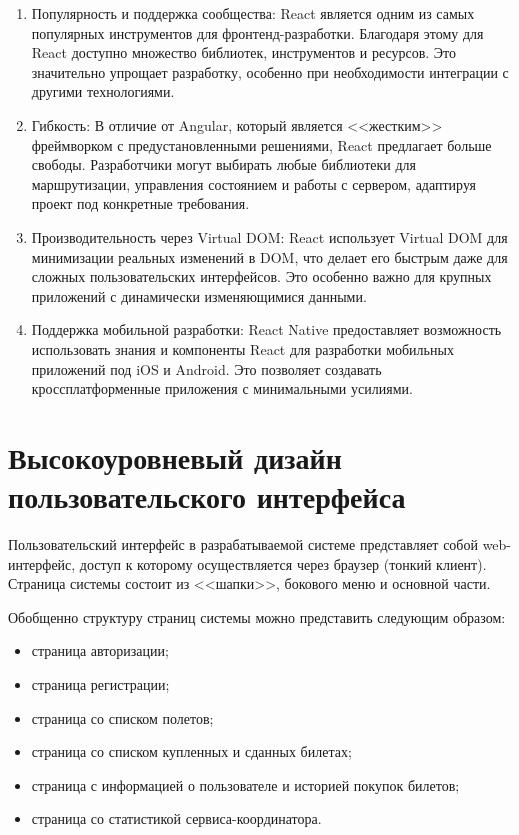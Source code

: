 \begin{enumerate}
	\item Популярность и поддержка сообщества: React является одним из самых популярных инструментов для фронтенд-разработки. Благодаря этому для React доступно множество библиотек, инструментов и ресурсов. Это значительно упрощает разработку, особенно при необходимости интеграции с другими технологиями.
	\item Гибкость: В отличие от Angular, который является <<жестким>> фреймворком с предустановленными решениями, React предлагает больше свободы. Разработчики могут выбирать любые библиотеки для маршрутизации, управления состоянием и работы с сервером, адаптируя проект под конкретные требования.
	\item Производительность через Virtual DOM: React использует Virtual DOM для минимизации реальных изменений в DOM, что делает его быстрым даже для сложных пользовательских интерфейсов. Это особенно важно для крупных приложений с динамически изменяющимися данными.
	\item Поддержка мобильной разработки: React Native предоставляет возможность использовать знания и компоненты React для разработки мобильных приложений под iOS и Android. Это позволяет создавать кроссплатформенные приложения с минимальными усилиями.
\end{enumerate}


\section{Высокоуровневый дизайн пользовательского интерфейса}

Пользовательский интерфейс в разрабатываемой системе представляет собой web-интерфейс, доступ к которому осуществляется через браузер (тонкий клиент). Страница системы состоит из <<шапки>>, бокового меню и основной части.  

Обобщенно структуру страниц системы можно представить следующим образом:
\begin{itemize}
  \item страница авторизации;
	\item страница регистрации;
	\item страница со списком полетов;
	\item страница со списком купленных и сданных билетах;
	\item страница с информацией о пользователе и историей покупок билетов;
	\item страница со статистикой сервиса-координатора.
\end{itemize}

